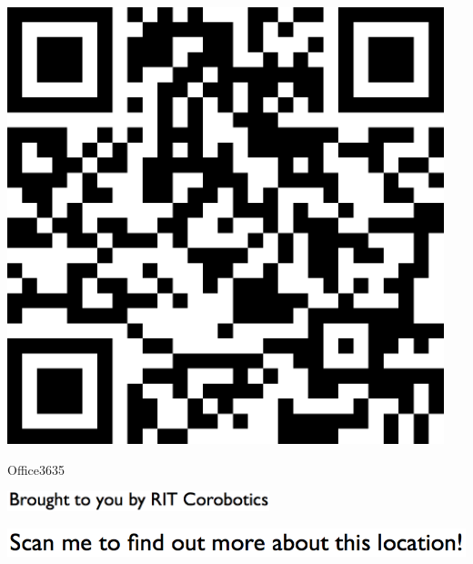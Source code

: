\documentclass[letterpaper]{article}
\begin{document}
 \begingroup 
 \centerline{\includegraphics[scale=1,width=5in,height=5in]{Office3635.png}} 
 \endgroup 
 \vspace*{\fill} 

 \hfill{\small Office3635} 

  \vspace{0.7in} 
 
 \centerline{\includegraphics[scale=1,width=3in]{text-bottom.png}} 
 
 \pagebreak 
{} 
 \vspace*{\fill} 
 
  \centerline{\includegraphics[scale=1,width=6in]{text-top.png}} 
 
 \vspace{0.5in} 
 
\end{document}
